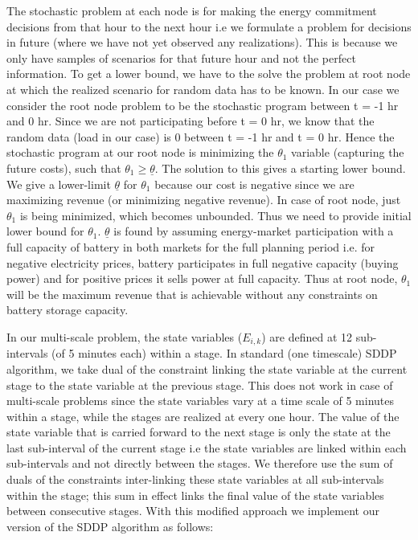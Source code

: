 \documentclass[11pt,twoside]{article}
\begin{document}
The stochastic problem at each node is for making the energy commitment decisions from that hour to the next hour i.e we formulate a problem for decisions in future (where we have not yet observed any realizations). This is because we only have samples of scenarios for that future hour and not the perfect information. To get a lower bound, we have to the solve the problem at root node at which the realized scenario for random data has to be known. In our case we consider the root node problem to be the stochastic program between t = -1 hr and 0 hr. Since we are not participating before t = 0 hr, we know that the random data (load in our case) is 0 between t = -1 hr and t = 0 hr. Hence the stochastic program at our root node is minimizing the $\theta_{1}$ variable (capturing the future costs), such that $\theta_{1} \geq \underline{\theta}$. The solution to this gives a starting lower bound. We give a lower-limit $\underline{\theta}$ for $\theta_1$ because our cost is negative since we are maximizing revenue (or minimizing negative revenue). In case of root node, just $\theta_1$ is being minimized, which becomes unbounded. Thus we need to provide initial lower bound for $\theta_1$. $\underline{\theta}$ is found by assuming energy-market participation with a full capacity of battery in both markets for the full planning period i.e. for negative electricity prices, battery participates in full negative capacity (buying power) and for positive prices it sells power at full capacity. Thus at root node, $\theta_1$ will be the maximum revenue that is achievable without any constraints on battery storage capacity.   

In our multi-scale problem, the state variables ($E_{i,k}$) are defined at 12 sub-intervals (of 5 minutes each) within a stage.  In standard (one timescale) SDDP algorithm, we take dual of the constraint linking the state variable at the current stage to the state variable at the previous stage. This does not work in case of multi-scale problems since the state variables vary at a time scale of 5 minutes within a stage, while the stages are realized at every one hour. The value of the state variable that is carried forward to the next stage is only the state at the last sub-interval of the current stage i.e the state variables are linked within each sub-intervals and not directly between the stages. We therefore use the sum of duals of the constraints inter-linking these state variables at all sub-intervals within the stage; this sum in effect links the final value of the state variables between consecutive stages. With this modified approach we implement our version of the SDDP algorithm as follows:    
\end{document}

